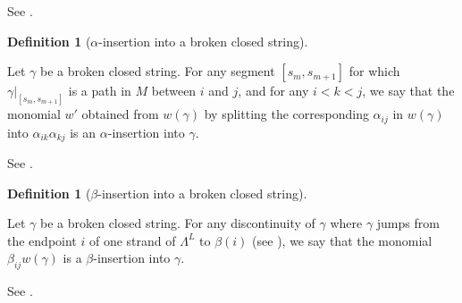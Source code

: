 \documentclass[a4paper,final, reqno]{amsart}
\theoremstyle{plain}
\theoremstyle{definition}
\newtheorem{Def}[Th]{Definition}
\begin{document}
	See .
	
	\begin{Def} [$\alpha$-insertion into a broken closed string] \-\
		
		Let $\gamma$ be a broken closed string. For any segment $[s_m, s_{m+1}]$ for which $\gamma|_{[s_m, s_{m+1}]}$ is a path in $M$ between $i$ and $j$, and for any $i<k<j$, we say that the monomial $w'$ obtained from $w(\gamma)$ by splitting the corresponding $\alpha_{ij}$ in $w(\gamma)$ into $\alpha_{ik}\alpha_{kj}$ is an $\alpha$-insertion into $\gamma$. 
	\end{Def}
	
	See .
	
	\begin{Def}[$\beta$-insertion into a broken closed string] \-\
		
		Let $\gamma$ be a broken closed string. For any discontinuity of $\gamma$ where $\gamma$ jumps from the endpoint $i$ of one strand of $\Lambda^L$ to $\beta(i)$ (see ), we say that the monomial $\beta_{ij} w(\gamma)$ is a $\beta$-insertion into $\gamma$.
		
	\end{Def}
	
	See .
	
\end{document}
